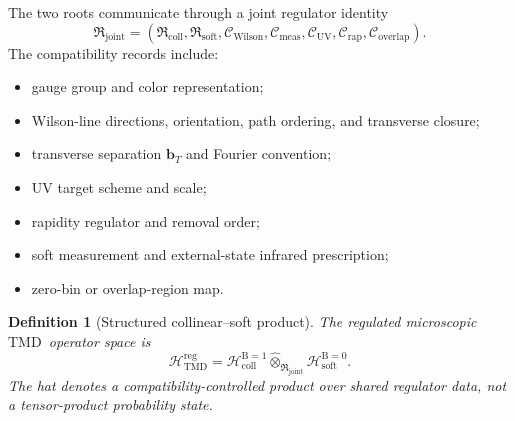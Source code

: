 \documentclass[11pt]{article}
\newtheorem{definition}{Definition}[section]
\newcommand{\TMD}{\ensuremath{\mathrm{TMD}}}
\newcommand{\bT}{\bm b_T}
\newcommand{\cO}{\mathcal O}
\newcommand{\cC}{\mathcal C}
\newcommand{\cH}{\mathcal H}
\newcommand{\Coll}{\ensuremath{\mathrm{coll}}}
\newcommand{\Soft}{\ensuremath{\mathrm{soft}}}
\newcommand{\Bare}{\ensuremath{\mathrm{bare}}}
\newcommand{\Ren}{\ensuremath{\mathrm{ren}}}
\newcommand{\Unsub}{\ensuremath{\mathrm{unsub}}}
\newcommand{\Mic}{\ensuremath{\mathrm{Mic}}}
\newcommand{\Bnum}{\mathrm B}
\begin{document}
The two roots communicate through a joint regulator identity
\begin{equation}
 \mathfrak R_{\mathrm{joint}}
 =
 \left(
 \mathfrak R_{\Coll},
 \mathfrak R_{\Soft},
 \cC_{\mathrm{Wilson}},
 \cC_{\mathrm{meas}},
 \cC_{\mathrm{UV}},
 \cC_{\mathrm{rap}},
 \cC_{\mathrm{overlap}}
 \right).
 \label{eq:joint-regulator}
\end{equation}
The compatibility records include:
\begin{itemize}
\item gauge group and color representation;
\item Wilson-line directions, orientation, path ordering, and transverse closure;
\item transverse separation \(\bT\) and Fourier convention;
\item UV target scheme and scale;
\item rapidity regulator and removal order;
\item soft measurement and external-state infrared prescription;
\item zero-bin or overlap-region map.
\end{itemize}

\begin{definition}[Structured collinear--soft product]
The regulated microscopic \TMD\ operator space is
\begin{equation}
 \cH_{\TMD}^{\mathrm{reg}}
 =
 \cH_{\Coll}^{\Bnum=1}
 \widehat\otimes_{\mathfrak R_{\mathrm{joint}}}
 \cH_{\Soft}^{\Bnum=0}.
 \label{eq:structured-product}
\end{equation}
The hat denotes a compatibility-controlled product over shared regulator data, not a tensor-product probability state.
\end{definition}

\begin{center}
\end{center}
\end{document}
